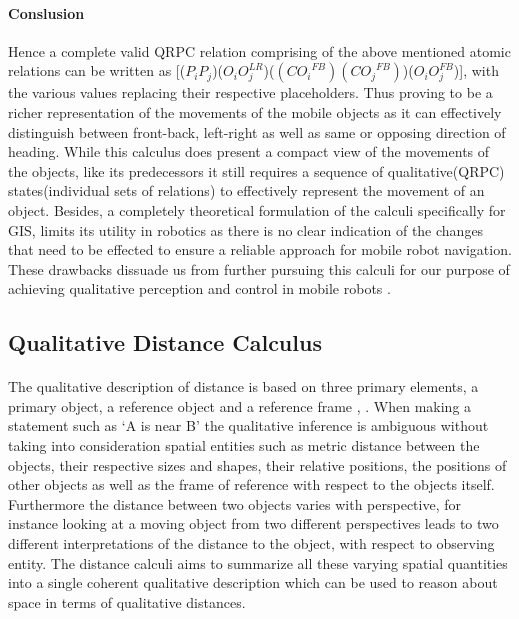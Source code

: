 \begin{enumerate}
\begin{itemize}
\begin{itemize}
		\end{itemize}
	
		\end{itemize}
	\end{enumerate}
	\paragraph{Conslusion}Hence a complete valid QRPC relation comprising of the above mentioned atomic relations can be written as [($P_iP_j$)($O_iO_j^{LR}$)($({CO_i}^{FB})({CO_j}^{FB})$)($O_iO_j^{FB}$)], with the various values replacing their respective placeholders. Thus proving to be a richer representation of the movements of the mobile objects as it can effectively distinguish  between front-back, left-right as well as same or opposing direction of heading. While this calculus does present a compact view of the movements of the objects, like its predecessors it still requires a sequence of qualitative(QRPC) states(individual sets of relations) to effectively represent the movement of an object. Besides, a completely theoretical formulation of the calculi specifically for GIS, limits its utility in robotics as there is no clear indication of the changes that need to be effected to ensure a reliable approach for mobile robot navigation. These drawbacks dissuade us from further pursuing this calculi for our purpose of achieving qualitative perception and control in mobile robots \cite{glez2013qrpc}. 
	
	\subsection{Qualitative Distance Calculus}
	\paragraph{} The qualitative description of distance is based on three primary elements, a primary object, a reference object and a reference frame \cite{clementini1997qualitative}, \cite{zimmermann1996qualitative}. When making a statement such as `A is near B' the qualitative inference is ambiguous without taking into consideration spatial entities such as metric distance between the objects, their respective sizes and shapes, their relative positions, the positions of other objects as well as the frame of reference with respect to the objects itself. Furthermore the distance between two objects varies with perspective, for instance looking at a moving object from two different perspectives leads to two different interpretations of the distance to the object, with respect to observing entity. The distance calculi aims to summarize all these varying spatial quantities into a single coherent qualitative description which can be used to reason about space in terms of qualitative distances.
